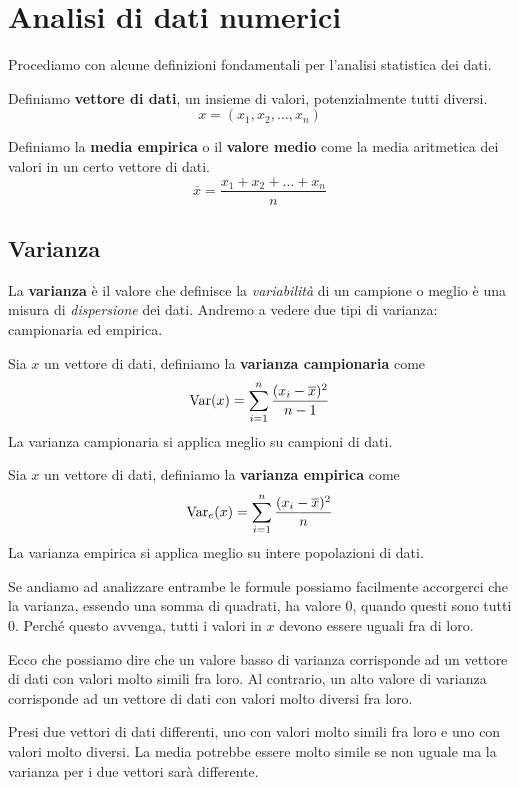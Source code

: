 \chapter{Analisi di dati numerici}
Procediamo con alcune definizioni fondamentali per l'analisi statistica dei dati.

\begin{definition} \label{vettore}
	Definiamo \textbf{vettore di dati}, un insieme di valori, potenzialmente tutti diversi.
	\[ x = (x_1, x_2, \dots, x_n) \]
\end{definition}

\begin{definition}
	Definiamo la \textbf{media empirica} o il \textbf{valore medio} come la media aritmetica dei valori in un certo
	vettore di dati.
	\[ \overline{x} = \frac{x_1 + x_2 + \dots + x_n}{n} \]
\end{definition}

\section{Varianza}
La \textbf{varianza} è il valore che definisce la \emph{variabilità} di un campione o meglio è una misura di
\emph{dispersione} dei dati. Andremo a vedere due tipi di varianza: campionaria ed empirica.

\begin{definition}
	Sia $x$ un vettore di dati, definiamo la \textbf{varianza campionaria} come
	\[ \operatorname{Var}(x) = \sum_{i=1}^n \frac{(x_i - \overline{x})^2}{n - 1} \]
	La varianza campionaria si applica meglio su campioni di dati.
\end{definition}

\begin{definition}
	Sia $x$ un vettore di dati, definiamo la \textbf{varianza empirica} come
	\[ \operatorname{Var}_e(x) = \sum_{i=1}^n \frac{(x_i - \overline{x})^2}{n} \]
	La varianza empirica si applica meglio su intere popolazioni di dati.
\end{definition}

\begin{observation}
	Se andiamo ad analizzare entrambe le formule possiamo facilmente accorgerci che la varianza, essendo una somma di
	quadrati, ha valore 0, quando questi sono tutti 0. Perché questo avvenga, tutti i valori in $x$ devono essere
	uguali fra di loro.

	Ecco che possiamo dire che un valore basso di varianza corrisponde ad un vettore di dati con valori molto simili
	fra loro. Al contrario, un alto valore di varianza corrisponde ad un vettore di dati con valori molto diversi fra
	loro.

	Presi due vettori di dati differenti, uno con valori molto simili fra loro e uno con valori molto diversi. La
	media potrebbe essere molto simile se non uguale ma la varianza per i due vettori sarà differente.
\end{observation}

